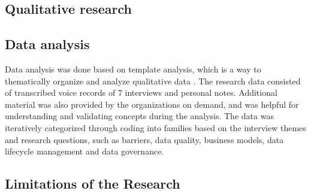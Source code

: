 \subsection{Qualitative research}


\subsection{Data analysis}

Data analysis was done based on template analysis, which is a way to thematically organize and analyze qualitative data \cite{king1998template}. The research data consisted of transcribed voice records of 7 interviews and personal notes. Additional material was also provided by the organizations on demand, and was helpful for understanding and validating concepts during the analysis. The data was iteratively categorized through coding into families based on the interview themes and research questions, such as barriers, data quality, business models, data lifecycle management and data governance. 

\subsection{Limitations of the Research}





